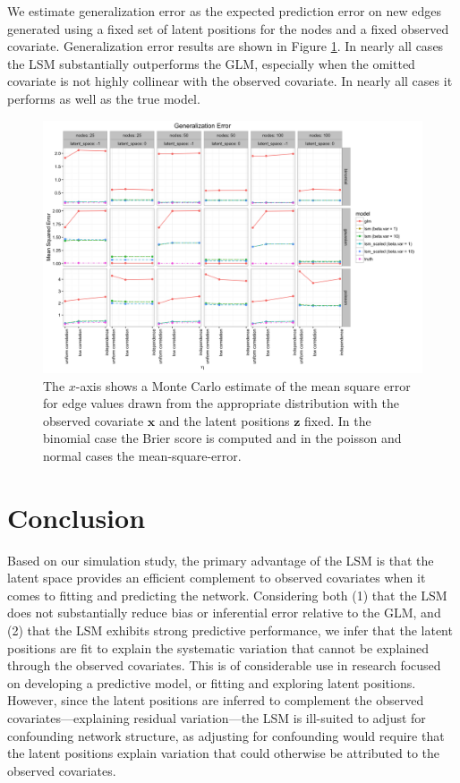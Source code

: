 \documentclass[11pt]{article}
\begin{document}
We estimate generalization error as the expected prediction error on new edges generated using a fixed set of latent positions for the nodes and a fixed observed covariate. Generalization error results are shown in Figure \ref{fig:generalization}. In nearly all cases the LSM substantially outperforms the GLM, especially when the omitted covariate is not highly collinear with the observed covariate. In nearly all cases it performs as well as the true model. 

\begin{figure}
\includegraphics[width=\textwidth]{figures/generalization.png}
\caption{The $x$-axis shows a Monte Carlo estimate of the mean square error for edge values drawn from the appropriate distribution with the observed covariate $\mathbf{x}$ and the latent positions $\mathbf{z}$ fixed. In the binomial case the Brier score is computed and in the poisson and normal cases the mean-square-error. \label{fig:generalization}}
\end{figure}

\section{Conclusion}

Based on our simulation study, the primary advantage of the LSM is that the latent space provides an efficient complement to observed covariates when it comes to fitting and predicting the network. Considering both (1) that the LSM does not substantially reduce bias or inferential error relative to the GLM, and (2) that the LSM exhibits strong predictive performance, we infer that the latent positions are fit to explain the systematic variation that cannot be explained through the observed covariates. This is of considerable use in research focused on developing a predictive model, or fitting and exploring latent positions. However, since the latent positions are inferred to complement the observed covariates---explaining residual variation---the LSM is ill-suited to adjust for confounding network structure, as adjusting for confounding would require that the latent positions explain variation that could otherwise be attributed to the observed covariates.
\end{document}

